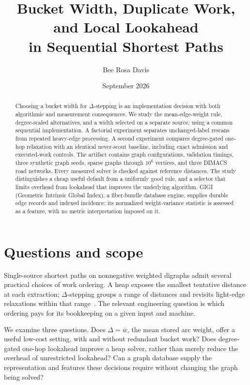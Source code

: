 \documentclass[11pt]{article}
\title{Bucket Width, Duplicate Work, and Local Lookahead\\in Sequential Shortest Paths}
\author{Bee Rosa Davis}
\date{September 2026}
\newcommand{\meanw}{\overline{w}}
\begin{document}
\maketitle
\begin{abstract}
Choosing a bucket width for $\Delta$-stepping is an implementation decision with
both algorithmic and measurement consequences. We study the mean-edge-weight
rule, degree-scaled alternatives, and a width selected on a separate source,
using a common sequential implementation. A factorial experiment separates
unchanged-label rescans from repeated heavy-edge processing. A second experiment
compares degree-gated one-hop relaxation with an identical never-scout baseline,
including exact admission and executed-work controls. The artifact contains
\GraphCount{} graph configurations, \ValidationCount{} validation timings, three
synthetic graph seeds, sparse graphs through $10^6$ vertices, and three DIMACS
road networks. Every measured solver is checked against reference distances.
\AbstractFinding{}
The study distinguishes a cheap useful default from a uniformly good rule, and
a selector that limits overhead from lookahead that improves the underlying
algorithm. GIGI (Geometric Intrinsic Global Index), a fiber-bundle database
engine, supplies durable edge records and indexed incidence; its
normalized weight-variance statistic is assessed as a feature, with no metric
interpretation imposed on it.
\end{abstract}

\section{Questions and scope}
Single-source shortest paths on nonnegative weighted digraphs admit several
practical choices of work ordering. A heap exposes the smallest tentative
distance at each extraction; $\Delta$-stepping groups a range of distances and
revisits light-edge relaxations within that range~\cite{dijkstra,meyer}.
The relevant engineering question is which ordering pays for its bookkeeping
on a given input and machine.

We examine three questions. Does $\Delta=\meanw$, the mean stored arc weight,
offer a useful low-cost setting, with and without redundant bucket work? Does
degree-gated one-hop lookahead improve a heap solver, rather than merely reduce
the overhead of unrestricted lookahead? Can a graph database supply the
representation and features these decisions require without changing the graph
being solved?
\end{document}
